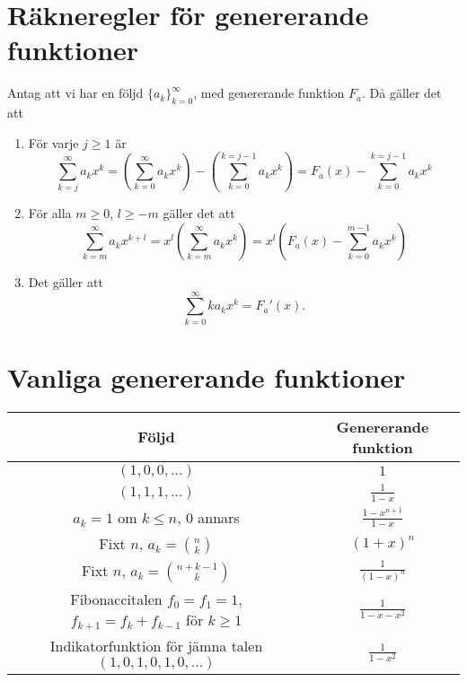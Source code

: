\documentclass[nobib]{tufte-handout}
\begin{document}
\section{Räkneregler för genererande funktioner}

\begin{lemma}
  Antag att vi har en följd $\{a_k\}_{k=0}^\infty$, med genererande funktion $F_a$. Då gäller det att
  \begin{enumerate}
      \item För varje $j \geq 1$ är
      $$\sum_{k = j}^{\infty} a_k x^k = \left(\sum_{k=0}^{\infty}a_k x^k\right) - \left(\sum_{k=0}^{k=j-1} a_kx^k\right) = F_a(x) - \sum_{k=0}^{k=j-1} a_kx^k$$
      \item För alla $m \geq 0$, $l \geq -m$ gäller det att
      $$\sum_{k=m}^{\infty} a_k x^{k + l} = x^l\left(\sum_{k=m}^{\infty} a_k x^{k}\right) = x^l\left(F_a(x) - \sum_{k=0}^{m-1} a_k x^k\right)$$
      \item Det gäller att
      $$\sum_{k=0}^{\infty} k a_k x^k = F_a'(x).$$
  \end{enumerate}
\end{lemma}

\section{Vanliga genererande funktioner}

\begin{tabularx}{\linewidth}{cc}
  Följd & Genererande funktion\\
  \midrule
  $(1, 0, 0, \ldots)$ & $1$\\
  $(1,1,1,\ldots)$ & $\frac{1}{1-x}$\\
  $a_k = 1$ om $k \leq n$, $0$ annars & $\frac{1 - x^{n+1}}{1 - x}$\\
  Fixt $n$, $a_k = \binom{n}{k}$ & $(1+x)^n$\\
  Fixt $n$, $a_k = \binom{n+k-1}{k}$ & $\frac{1}{(1-x)^n}$\\
  \specialcell{Fibonaccitalen\\$f_0 = f_1 = 1$, $f_{k+1} = f_k + f_{k-1}$ för $k \geq 1$} & $\frac{1}{1 - x - x^2}$\\
  \specialcell{Indikatorfunktion för jämna talen\\$(1,0,1,0,1,0,\ldots)$} & $\frac{1}{1-x^2}$
\end{tabularx}

%
%
\end{document}
